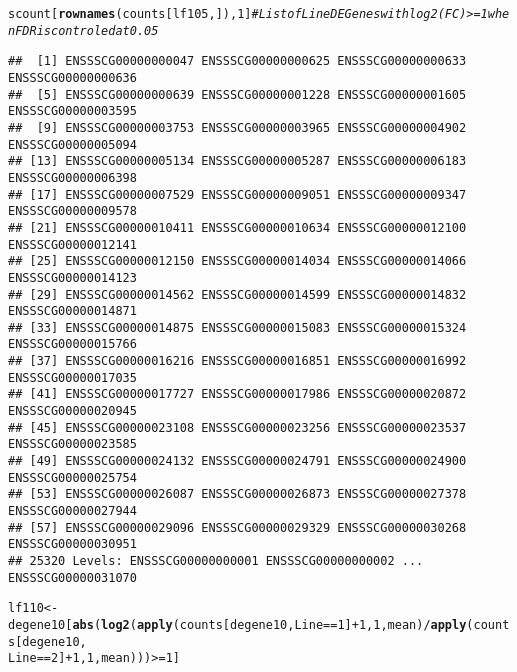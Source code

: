\documentclass{article}\usepackage[]{graphicx}\usepackage[]{color}
\makeatletter
\newcommand{\hlnum}[1]{\textcolor[rgb]{0.686,0.059,0.569}{#1}}%
\newcommand{\hlcom}[1]{\textcolor[rgb]{0.678,0.584,0.686}{\textit{#1}}}%
\newcommand{\hlopt}[1]{\textcolor[rgb]{0,0,0}{#1}}%
\newcommand{\hlstd}[1]{\textcolor[rgb]{0.345,0.345,0.345}{#1}}%
\newcommand{\hlkwb}[1]{\textcolor[rgb]{0.69,0.353,0.396}{#1}}%
\newcommand{\hlkwd}[1]{\textcolor[rgb]{0.737,0.353,0.396}{\textbf{#1}}}%
\newenvironment{kframe}{%
 \def\at@end@of@kframe{}%
 \ifinner\ifhmode%
  \def\at@end@of@kframe{\end{minipage}}%
  \begin{minipage}{\columnwidth}%
 \fi\fi%
 \def\FrameCommand##1{\hskip\@totalleftmargin \hskip-\fboxsep
 \colorbox{shadecolor}{##1}\hskip-\fboxsep
     \hskip-\linewidth \hskip-\@totalleftmargin \hskip\columnwidth}%
 \MakeFramed {\advance\hsize-\width
   \@totalleftmargin\z@ \linewidth\hsize
   \@setminipage}}%
 {\par\unskip\endMakeFramed%
 \at@end@of@kframe}
\newenvironment{knitrout}{}{} %
\makeatother
\begin{document}
\begin{knitrout}
\begin{kframe}
\begin{alltt}
\hlstd{scount[}\hlkwd{rownames}\hlstd{(counts[lf105, ]),} \hlnum{1}\hlstd{]}  \hlcom{# List of  Line DE Genes with log2(FC) >=1 when FDR is controled at 0.05}
\end{alltt}
\begin{verbatim}
##  [1] ENSSSCG00000000047 ENSSSCG00000000625 ENSSSCG00000000633 ENSSSCG00000000636
##  [5] ENSSSCG00000000639 ENSSSCG00000001228 ENSSSCG00000001605 ENSSSCG00000003595
##  [9] ENSSSCG00000003753 ENSSSCG00000003965 ENSSSCG00000004902 ENSSSCG00000005094
## [13] ENSSSCG00000005134 ENSSSCG00000005287 ENSSSCG00000006183 ENSSSCG00000006398
## [17] ENSSSCG00000007529 ENSSSCG00000009051 ENSSSCG00000009347 ENSSSCG00000009578
## [21] ENSSSCG00000010411 ENSSSCG00000010634 ENSSSCG00000012100 ENSSSCG00000012141
## [25] ENSSSCG00000012150 ENSSSCG00000014034 ENSSSCG00000014066 ENSSSCG00000014123
## [29] ENSSSCG00000014562 ENSSSCG00000014599 ENSSSCG00000014832 ENSSSCG00000014871
## [33] ENSSSCG00000014875 ENSSSCG00000015083 ENSSSCG00000015324 ENSSSCG00000015766
## [37] ENSSSCG00000016216 ENSSSCG00000016851 ENSSSCG00000016992 ENSSSCG00000017035
## [41] ENSSSCG00000017727 ENSSSCG00000017986 ENSSSCG00000020872 ENSSSCG00000020945
## [45] ENSSSCG00000023108 ENSSSCG00000023256 ENSSSCG00000023537 ENSSSCG00000023585
## [49] ENSSSCG00000024132 ENSSSCG00000024791 ENSSSCG00000024900 ENSSSCG00000025754
## [53] ENSSSCG00000026087 ENSSSCG00000026873 ENSSSCG00000027378 ENSSSCG00000027944
## [57] ENSSSCG00000029096 ENSSSCG00000029329 ENSSSCG00000030268 ENSSSCG00000030951
## 25320 Levels: ENSSSCG00000000001 ENSSSCG00000000002 ... ENSSSCG00000031070
\end{verbatim}
\begin{alltt}
\hlstd{lf110} \hlkwb{<-} \hlstd{degene10[}\hlkwd{abs}\hlstd{(}\hlkwd{log2}\hlstd{(}\hlkwd{apply}\hlstd{(counts[degene10, Line} \hlopt{==} \hlnum{1}\hlstd{]} \hlopt{+} \hlnum{1}\hlstd{,} \hlnum{1}\hlstd{, mean)}\hlopt{/}\hlkwd{apply}\hlstd{(counts[degene10,}
    \hlstd{Line} \hlopt{==} \hlnum{2}\hlstd{]} \hlopt{+} \hlnum{1}\hlstd{,} \hlnum{1}\hlstd{, mean)))} \hlopt{>=} \hlnum{1}\hlstd{]}


\end{alltt}
\end{kframe}
\end{knitrout}
\end{document}

